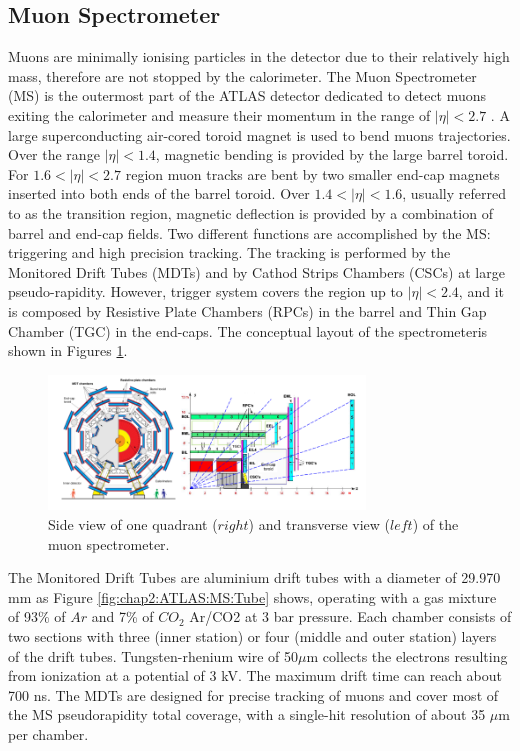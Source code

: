 \subsection{Muon Spectrometer}
\label{chap2:ATLAS:MS}
Muons are minimally ionising particles in the detector due to their relatively high mass, therefore are not stopped by the calorimeter. The Muon Spectrometer (MS) is the outermost part of the ATLAS detector dedicated to detect muons exiting the calorimeter and measure their momentum in the range of $|\eta| < 2.7$ \cite{Muon_TDR}. A large superconducting air-cored toroid magnet is used to bend muons trajectories. Over the range $|\eta| < 1.4$, magnetic bending is provided by the large barrel toroid. For $1.6<|\eta| < 2.7$ region muon tracks are bent by two smaller end-cap magnets inserted into both ends of the barrel toroid. Over $1.4<|\eta|<1.6$, usually referred to as the transition region, magnetic deflection is provided by a combination of barrel and end-cap fields. Two different functions are accomplished by the MS: triggering and high precision tracking. The tracking is performed by the Monitored Drift Tubes (MDTs) and by Cathod Strips Chambers (CSCs) at large pseudo-rapidity. However, trigger system covers the region up to $|\eta| < 2.4$, and it is composed by Resistive Plate Chambers (RPCs) in the barrel and Thin Gap Chamber (TGC) in the end-caps. The conceptual layout of the spectrometeris shown in Figures \ref{fig:chap2:ATLAS:MS}. \\
\begin{figure}[ht]
    \centering
    \includegraphics[width=0.75\textwidth]{Ch2/Img/Muon.png}
    \caption{Side view of one quadrant ($right$) and transverse view ($left$) of the muon spectrometer.}
    \label{fig:chap2:ATLAS:MS}
\end{figure}
The Monitored Drift Tubes are aluminium drift tubes with a diameter of 29.970 mm as Figure \ref{fig:chap2:ATLAS:MS:Tube} shows, operating with a gas mixture of 93\% of $Ar$ and 7\% of $CO_2$ Ar/CO2 at 3 bar pressure. Each chamber consists of two sections with three (inner station) or four (middle and outer station) layers of the drift tubes. Tungsten-rhenium wire of 50$\mu$m collects the electrons resulting from ionization at a potential of 3 kV. The maximum drift time can reach about 700 ns. The MDTs are designed for precise tracking of muons and cover most of the MS pseudorapidity total coverage, with a single-hit resolution of about 35 $\mu$m per chamber. \\
